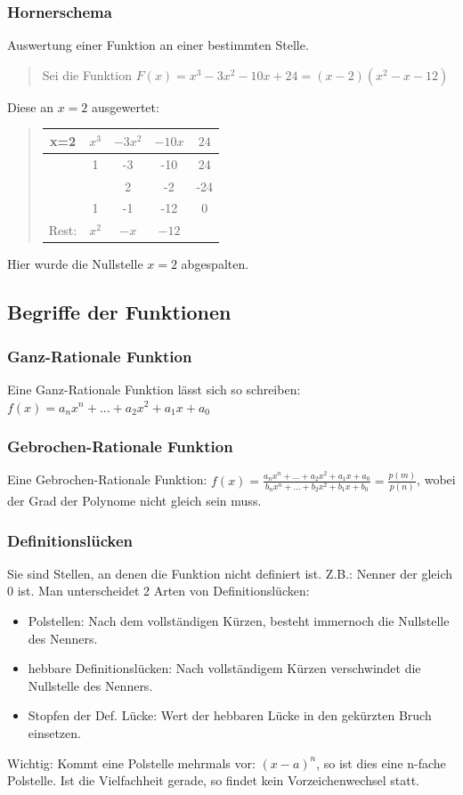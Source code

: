 \subsubsection*{Hornerschema}

Auswertung einer Funktion an einer bestimmten Stelle.
\begin{verse}
Sei die Funktion $F(x)=x^{3}-3x^{2}-10x+24=(x-2)(x^{2}-x-12)$
\end{verse}
Diese an $x=2$ ausgewertet:
\begin{verse}
\begin{tabular}{ccccc}
\hline 
\multicolumn{1}{|c}{x=2} & $x^{3}$ & $-3x^{2}$ & $-10x$ & \multicolumn{1}{c|}{$24$}\tabularnewline
\hline 
 & 1 & -3 & -10 & 24\tabularnewline
 &  & 2 & -2 & -24\tabularnewline
\hline 
 & 1 & -1 & -12 & 0\tabularnewline
\hline 
Rest: & $x^{2}$ & $-x$ & $-12$ & \tabularnewline
\end{tabular}
\end{verse}
Hier wurde die Nullstelle $x=2$ abgespalten.


\subsection*{Begriffe der Funktionen}


\subsubsection*{Ganz-Rationale Funktion}

Eine Ganz-Rationale Funktion lässt sich so schreiben: $f(x)=a_{n}x^{n}+...+a_{2}x^{2}+a_{1}x+a_{0}$


\subsubsection*{Gebrochen-Rationale Funktion}

Eine Gebrochen-Rationale Funktion: $f(x)=\frac{a_{n}x^{n}+...+a_{2}x^{2}+a_{1}x+a_{0}}{b_{n}x^{n}+...+b_{2}x^{2}+b_{1}x+b_{0}}=\frac{p(m)}{p(n)}$,
wobei der Grad der Polynome nicht gleich sein muss.


\subsubsection*{Definitionslücken}

Sie sind Stellen, an denen die Funktion nicht definiert ist. Z.B.:
Nenner der gleich 0 ist. Man unterscheidet 2 Arten von Definitionslücken:
\begin{itemize}
\item Polstellen: Nach dem vollständigen Kürzen, besteht immernoch die Nullstelle
des Nenners.
\item hebbare Definitionslücken: Nach vollständigem Kürzen verschwindet
die Nullstelle des Nenners.
\item Stopfen der Def. Lücke: Wert der hebbaren Lücke in den gekürzten Bruch
einsetzen. 
\end{itemize}
Wichtig: Kommt eine Polstelle mehrmals vor: $(x-a)^{n}$, so ist dies
eine n-fache Polstelle. Ist die Vielfachheit gerade, so findet kein
Vorzeichenwechsel statt.


